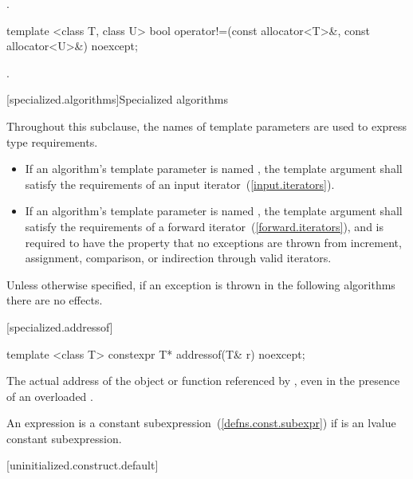 \begin{itemdescr}
\pnum
\returns
{}.
\end{itemdescr}

%
\begin{itemdecl}
template <class T, class U>
  bool operator!=(const allocator<T>&, const allocator<U>&) noexcept;
\end{itemdecl}

\begin{itemdescr}
\pnum
\returns
{}.
\end{itemdescr}

[specialized.algorithms]{Specialized algorithms}

\pnum
Throughout this subclause,
the names of template parameters are used to express type requirements.
\begin{itemize}
\item
If an algorithm's template parameter is named ,
the template argument shall satisfy the requirements
of an input iterator~(\ref{input.iterators}).
\item
If an algorithm's template parameter is named ,
the template argument shall satisfy the requirements
of a forward iterator~(\ref{forward.iterators}), and
is required to have the property that no exceptions are thrown
from increment, assignment, comparison, or indirection through valid iterators.
\end{itemize}
Unless otherwise specified,
if an exception is thrown in the following algorithms there are no effects.

[specialized.addressof]{}

%
\begin{itemdecl}
template <class T> constexpr T* addressof(T& r) noexcept;
\end{itemdecl}

\begin{itemdescr}
\pnum
\returns The actual address of the object or function referenced by , even in the
presence of an overloaded .

\pnum
\remarks An expression 
is a constant subexpression~(\ref{defns.const.subexpr})
if  is an lvalue constant subexpression.
\end{itemdescr}

[uninitialized.construct.default]{}

